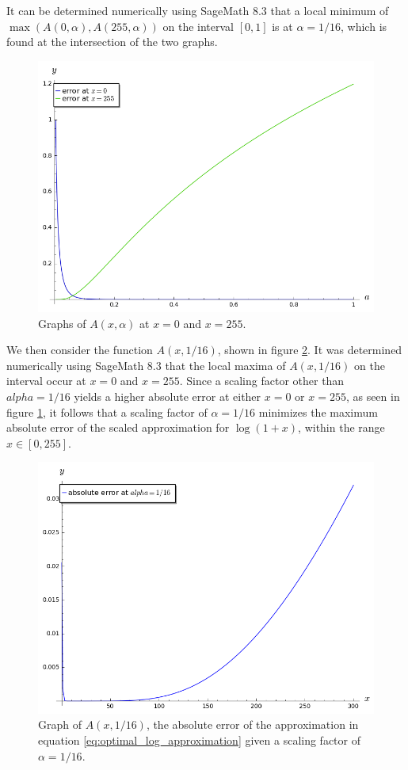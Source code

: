 It can be determined numerically using SageMath 8.3 that a local minimum of $\max(A(0,\alpha),A(255,\alpha))$ on the interval $[0,1]$ is at $\alpha = 1/16$, which is found at the intersection of the two graphs.
\begin{figure}[!ht]
		\centering
		\includegraphics[width=.9\linewidth]{figures/endpoint_plot.png}
		\caption{Graphs of $A(x,\alpha)$ at $x=0$ and $x=255$.}
		\label{fig:endpoint_plot}
\end{figure}
We then consider the function $A(x,1/16)$, shown in figure \ref{fig:single_alpha_plot}.
It was determined numerically using SageMath 8.3 that the local maxima of $A(x,1/16)$ on the interval occur at $x=0$ and $x=255$. Since a scaling factor other than $alpha=1/16$ yields a higher absolute error at either $x=0$ or $x=255$, as seen in figure \ref{fig:endpoint_plot}, it follows that a scaling factor of $\alpha = 1/16$ minimizes the maximum absolute error of the scaled approximation for $\log{(1+x)}$, within the range $x \in [0, 255]$.
\begin{figure}[!ht]
		\centering
		\includegraphics[width=.9\linewidth]{figures/single_alpha_plot.png}
		\caption{Graph of $A(x,1/16)$, the absolute error of the approximation in equation \ref{eq:optimal_log_approximation} given a scaling factor of $\alpha=1/16$.}
		\label{fig:single_alpha_plot}
\end{figure}

